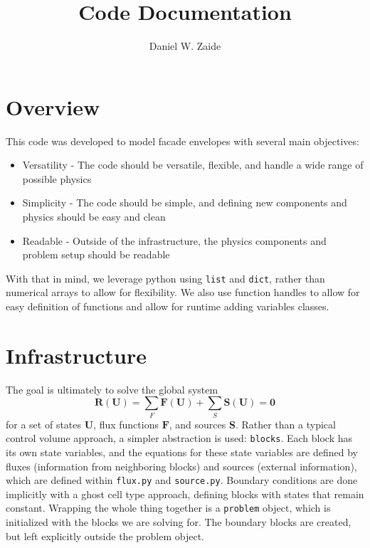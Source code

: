 \documentclass[11pt]{article}
\title{Code Documentation}
\author{Daniel W. Zaide}
\begin{document}
\maketitle

\section{Overview}

This code was developed to model facade envelopes with several main objectives:
\begin{itemize}
\item Versatility - The code should be versatile, flexible, and handle a wide range of possible physics
\item Simplicity - The code should be simple, and defining new components and physics should be easy and clean
\item Readable - Outside of the infrastructure, the physics components and problem setup should be readable
\end{itemize}

With that in mind, we leverage python using \lstinline{list} and \lstinline{dict}, rather than numerical arrays to allow for flexibility. We also use function handles to allow for easy definition of functions and allow for runtime adding variables classes.

\section{Infrastructure}
The goal is ultimately to solve the global system
\begin{equation}
\mathbf{R}(\mathbf{U}) = \sum_F \mathbf{F}(\mathbf{U}) + \sum_S \mathbf{S}(\mathbf{U}) = \mathbf{0}
\end{equation}
for a set of states $\mathbf{U}$, flux functions $\mathbf{F}$, and sources $\mathbf{S}$. Rather than a typical control volume approach, a simpler abstraction is used: \lstinline{blocks}. Each block has its own state variables, and the equations for these state variables are defined by fluxes (information from neighboring blocks) and sources (external information), which are defined within \lstinline{flux.py} and \lstinline{source.py}. Boundary conditions are done implicitly with a ghost cell type approach, defining blocks with states that remain constant. Wrapping the whole thing together is a \lstinline{problem} object, which is initialized with the blocks we are solving for. The boundary blocks are created, but left explicitly outside the problem object.
\end{document}
